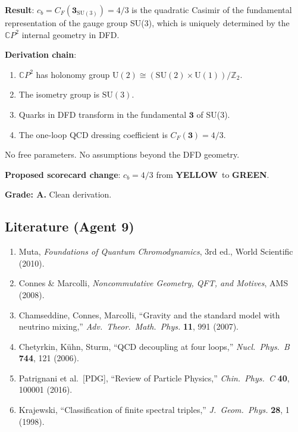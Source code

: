 \documentclass[11pt,a4paper]{article}
\newcommand{\GREEN}{\textcolor{dfdgreen}{\textbf{GREEN}}}
\newcommand{\YELLOW}{\textcolor{dfdyellow}{\textbf{YELLOW}}}
\newcommand{\CP}{\mathbb{C}P}
\begin{document}
\begin{tcolorbox}[colback=green!5!white, colframe=green!60!black, title={Agent 9: $c_b = 4/3$ --- DERIVED FROM $\CP^2$ HOLONOMY}]
\textbf{Result}: $c_b = C_F(\mathbf{3}_{\mathrm{SU}(3)}) = 4/3$ is the quadratic Casimir of the fundamental representation of the gauge group SU(3), which is uniquely determined by the $\CP^2$ internal geometry in DFD.

\textbf{Derivation chain}:
\begin{enumerate}
\item $\CP^2$ has holonomy group $\mathrm{U}(2) \cong (\mathrm{SU}(2) \times \mathrm{U}(1))/\mathbb{Z}_2$.
\item The isometry group is $\mathrm{SU}(3)$.
\item Quarks in DFD transform in the fundamental $\mathbf{3}$ of SU(3).
\item The one-loop QCD dressing coefficient is $C_F(\mathbf{3}) = 4/3$.
\end{enumerate}

No free parameters. No assumptions beyond the DFD geometry.

\textbf{Proposed scorecard change}: $c_b = 4/3$ from \YELLOW\ to \GREEN.

\textbf{Grade: A.} Clean derivation.
\end{tcolorbox}

\subsection{Literature (Agent 9)}

\begin{enumerate}
\item Muta, \textit{Foundations of Quantum Chromodynamics}, 3rd ed., World Scientific (2010).
\item Connes \& Marcolli, \textit{Noncommutative Geometry, QFT, and Motives}, AMS (2008).
\item Chamseddine, Connes, Marcolli, ``Gravity and the standard model with neutrino mixing,'' \textit{Adv.\ Theor.\ Math.\ Phys.} \textbf{11}, 991 (2007).
\item Chetyrkin, K\"uhn, Sturm, ``QCD decoupling at four loops,'' \textit{Nucl.\ Phys.\ B} \textbf{744}, 121 (2006).
\item Patrignani et al.\ [PDG], ``Review of Particle Physics,'' \textit{Chin.\ Phys.\ C} \textbf{40}, 100001 (2016).
\item Krajewski, ``Classification of finite spectral triples,'' \textit{J.\ Geom.\ Phys.} \textbf{28}, 1 (1998).
\end{enumerate}
\end{document}
